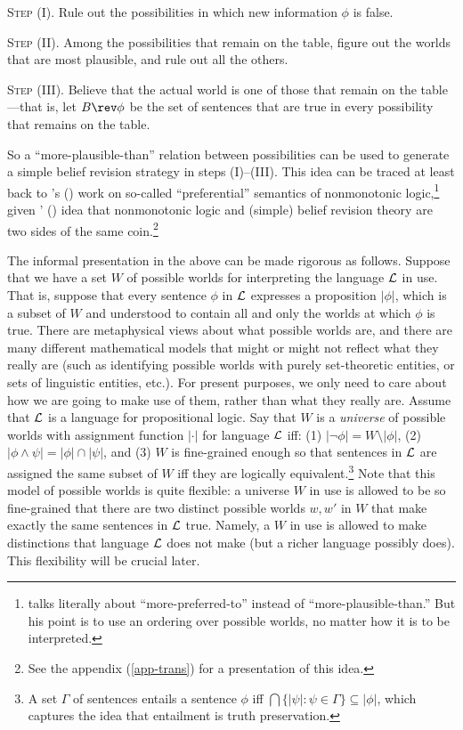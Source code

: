 	\xm \textsc{Step (I).} Rule out the possibilities in which new information $\phi$ is false.
	
	\xm \textsc{Step (II).} Among the possibilities that remain on the table, figure out the worlds that are most plausible, and rule out all the others.
	
	\xm \textsc{Step (III).} Believe that the actual world is one of those that remain on the table---that is, let $B \rev \phi$ be the set of sentences that are true in every possibility that remains on the table. 

\ed So a ``more-plausible-than'' relation between possibilities can be used to generate a simple belief revision strategy in steps (I)--(III). This idea can be traced at least back to \citeauthor{shoham1987semantical}'s () work on so-called ``preferential'' semantics of nonmonotonic logic,\footnote
	{\citet{shoham1987semantical} talks literally about ``more-preferred-to'' instead of ``more-plausible-than.'' But his point is to use an ordering over possible worlds, no matter how it is to be interpreted.} 
given \citeauthor{makinson1991relations}' () idea that nonmonotonic logic and (simple) belief revision theory are two sides of the same coin.\footnote
{See the appendix (\autoref{app-trans}) for a presentation of this idea.}

The informal presentation in the above can be made rigorous as follows. Suppose that we have a set $W$ of possible worlds for interpreting the language $\cal L$ in use. That is, suppose that every sentence $\phi$ in ${\cal L}$ expresses a proposition $|\phi|$, which is a subset of $W$ and understood to contain all and only the worlds at which $\phi$ is true.  There are metaphysical views about what possible worlds are, and there are many different mathematical models that might or might not reflect what they really are (such as identifying possible worlds with purely set-theoretic entities, or sets of linguistic entities, etc.). For present purposes, we only need to care about how we are going to make use of them, rather than what they really are. Assume that ${\cal L}$ is a language for propositional logic. Say that $W$ is a {\em universe} of possible worlds with assignment function $|\cdot|$ for language ${\cal L}$ iff: (1) $|\neg\phi| = W \setminus |\phi|$, (2) $|\phi\wedge\psi| = |\phi|\cap|\psi|$, and (3) $W$ is fine-grained enough so that sentences in $\cal L$ are assigned the same subset of $W$ iff they are logically equivalent.\footnote
	{A set $\Gamma$ of sentences entails a sentence $\phi$ iff $\bigcap \{ |\psi|: \psi \in \Gamma\} \subseteq |\phi|$, which captures the idea that entailment is truth preservation.} 
Note that this model of possible worlds is quite flexible: a universe $W$ in use is allowed to be so fine-grained that there are two distinct possible worlds $w, w'$ in $W$ that make exactly the same sentences in $\cal L$ true. Namely, a $W$ in use is allowed to make distinctions that language $\cal L$ does not make (but a richer language possibly does). This flexibility will be crucial later. 


